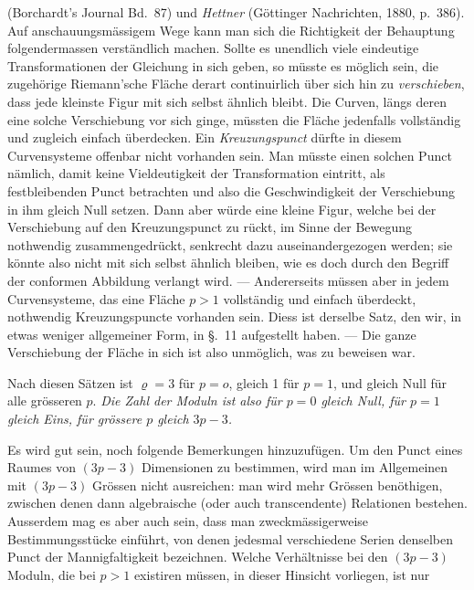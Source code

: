 \documentclass{article}
\begin{document}
(Borchardt's Journal Bd.~87) und \emph{Hettner} (Göttinger Nachrichten, 1880, p.~386). Auf anschauungsmässigem Wege kann man sich die Richtigkeit der Behauptung folgendermassen verständlich machen. Sollte es unendlich viele eindeutige Transformationen der Gleichung in sich geben, so müsste es möglich sein, die zugehörige Riemann'sche Fläche derart continuirlich über sich hin zu \emph{verschieben}, dass jede kleinste Figur mit sich selbst ähnlich bleibt. Die Curven, längs deren eine solche Verschiebung vor sich ginge, müssten die Fläche jedenfalls vollständig und zugleich einfach überdecken. Ein \emph{Kreuzungspunct} dürfte in diesem Curvensysteme offenbar nicht vorhanden sein. Man müsste einen solchen Punct nämlich, damit keine Vieldeutigkeit der Transformation eintritt, als festbleibenden Punct betrachten und also die Geschwindigkeit der Verschiebung in ihm gleich Null setzen. Dann aber würde eine kleine Figur, welche bei der Verschiebung auf den Kreuzungspunct zu rückt, im Sinne der Bewegung nothwendig zusammengedrückt, senkrecht dazu auseinandergezogen werden; sie könnte also nicht mit sich selbst ähnlich bleiben, wie es doch durch den Begriff der conformen Abbildung verlangt wird. --- Andererseits müssen aber in jedem Curvensysteme, das eine Fläche $p > 1$ vollständig und einfach überdeckt, nothwendig Kreuzungspuncte vorhanden sein. Diess ist derselbe Satz, den wir, in etwas weniger allgemeiner Form, in §.~11 aufgestellt haben. --- Die ganze Verschiebung der Fläche in sich ist also unmöglich, was zu beweisen war.

Nach diesen Sätzen ist $\varrho = 3$ für $p = o$, gleich 1 für $p = 1$, und gleich Null für alle grösseren $p$. \emph{Die Zahl der Moduln ist also für $p = 0$ gleich Null, für $p = 1$ gleich Eins, für grössere $p$ gleich $3p - 3$.}

Es wird gut sein, noch folgende Bemerkungen hinzuzufügen. Um den Punct eines Raumes von $(3p - 3)$ Dimensionen zu bestimmen, wird man im Allgemeinen mit $(3p - 3)$ Grössen nicht ausreichen: man wird mehr Grössen benöthigen, zwischen denen dann algebraische (oder auch transcendente) Relationen bestehen. Ausserdem mag es aber auch sein, dass man zweckmässigerweise Bestimmungsstücke einführt, von denen jedesmal verschiedene Serien denselben Punct der Mannigfaltigkeit bezeichnen. Welche Verhältnisse bei den $(3p - 3)$ Moduln, die bei $p > 1$ existiren müssen, in dieser Hinsicht vorliegen, ist nur
\end{document}
